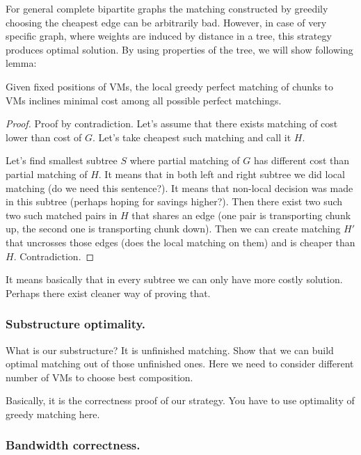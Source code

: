 For general complete bipartite graphs the matching constructed by greedily choosing the cheapest edge can be arbitrarily bad.
However, in case of very specific graph, where weights are induced by distance in a tree, this strategy produces optimal solution.
By using properties of the tree, we will show following lemma:

\begin{lemma}
  Given fixed positions of VMs, the local greedy perfect matching of chunks to VMs inclines minimal cost among all possible perfect matchings.
\end{lemma}

\begin{proof}
Proof by contradiction. Let's assume that there exists matching of cost lower than cost of $G$. Let's take cheapest such matching and call it $H$.

Let's find smallest subtree $S$ where partial matching of $G$ has different cost than partial matching of $H$. It means that in both left and right subtree we did local matching (do we need this sentence?). It means that non-local decision was made in this subtree (perhaps hoping for savings higher?). Then there exist two such two such matched pairs in $H$ that shares an edge (one pair is transporting chunk up, the second one is transporting chunk down). Then we can create matching $H'$ that uncrosses those edges (does the local matching on them) and is cheaper than $H$. Contradiction.


\end{proof}

It means basically that in every subtree we can only have more costly solution. Perhaps there exist cleaner way of proving that.

\subsubsection{Substructure optimality.}

What is our substructure? It is unfinished matching. Show that we can build optimal matching out of those unfinished ones. Here we need to
consider different number of VMs to choose best composition.

Basically, it is the correctness proof of our strategy. You have to use optimality of greedy matching here.

\subsubsection{Bandwidth correctness.}

